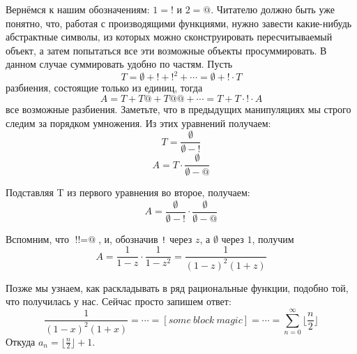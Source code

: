 \documentclass[12pt, letterpaper]{extarticle}
\begin{document}
Вернёмся к нашим обозначениям: $1=\texttt{!}$ и $2=\texttt{@}$. Читателю должно быть уже понятно, что, работая с производящими функциями, нужно завести какие-нибудь абстрактные символы, из которых можно сконструировать пересчитываемый объект, а затем попытаться все эти возможные объекты просуммировать. В данном случае суммировать удобно по частям. Пусть
\[T=\emptyset+\texttt{!}+\texttt{!}^2+\cdots=\emptyset+\texttt{!}\cdot T\]
разбиения, состоящие только из единиц, тогда
\[A=T+T\texttt{@}+T\texttt{@@}+\cdots=T+T\cdot\texttt{!}\cdot A\]
все возможные разбиения. Заметьте, что в предыдущих манипуляциях мы строго следим за порядком умножения. Из этих уравнений получаем:
\[T=\frac{\emptyset}{\emptyset-\texttt{!}}\]
\[A=T\cdot\frac{\emptyset}{\emptyset-\texttt{@}}\]

Подставляя T из первого уравнения во второе, получаем:
\[A=\frac{\emptyset}{\emptyset-\texttt{!}}\cdot\frac{\emptyset}{\emptyset-\texttt{@}}\]

Вспомним, что $\texttt{!!}=\texttt{@}$, и, обозначив \texttt{!} через $z$, а $\emptyset$ через $1$, получим
\[A=\frac{1}{1-z}\cdot\frac{1}{1-z^2}=\frac{1}{(1-z)^2(1+z)}\]

Позже мы узнаем, как раскладывать в ряд рациональные функции, подобно той, что получилась у нас. Сейчас просто запишем ответ:
\[\frac{1}{(1-x)^2(1+x)}=\cdots=[some\ block\ magic]=\cdots=\sum_{n=0}^{\infty}\lfloor\frac{n}{2}\rfloor\]
Откуда $a_n=\lfloor \frac{n}{2} \rfloor + 1$.
\end{document}
